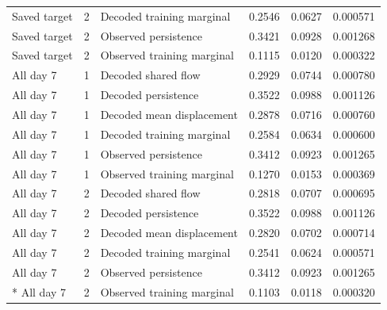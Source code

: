 {\begin{longtable}{@{}p{26mm}p{9mm}p{53mm}p{24mm}p{25mm}p{28mm}@{}}
Saved target & 2 & Decoded training marginal & 0.2546 & 0.0627 & 0.000571 \\
Saved target & 2 & Observed persistence & 0.3421 & 0.0928 & 0.001268 \\
Saved target & 2 & Observed training marginal & 0.1115 & 0.0120 & 0.000322 \\
All day 7 & 1 & Decoded shared flow & 0.2929 & 0.0744 & 0.000780 \\
All day 7 & 1 & Decoded persistence & 0.3522 & 0.0988 & 0.001126 \\
All day 7 & 1 & Decoded mean displacement & 0.2878 & 0.0716 & 0.000760 \\
All day 7 & 1 & Decoded training marginal & 0.2584 & 0.0634 & 0.000600 \\
All day 7 & 1 & Observed persistence & 0.3412 & 0.0923 & 0.001265 \\
All day 7 & 1 & Observed training marginal & 0.1270 & 0.0153 & 0.000369 \\
All day 7 & 2 & Decoded shared flow & 0.2818 & 0.0707 & 0.000695 \\
All day 7 & 2 & Decoded persistence & 0.3522 & 0.0988 & 0.001126 \\
All day 7 & 2 & Decoded mean displacement & 0.2820 & 0.0702 & 0.000714 \\
All day 7 & 2 & Decoded training marginal & 0.2541 & 0.0624 & 0.000571 \\
All day 7 & 2 & Observed persistence & 0.3412 & 0.0923 & 0.001265 \\*
All day 7 & 2 & Observed training marginal & 0.1103 & 0.0118 & 0.000320 \\
\end{longtable}
}

